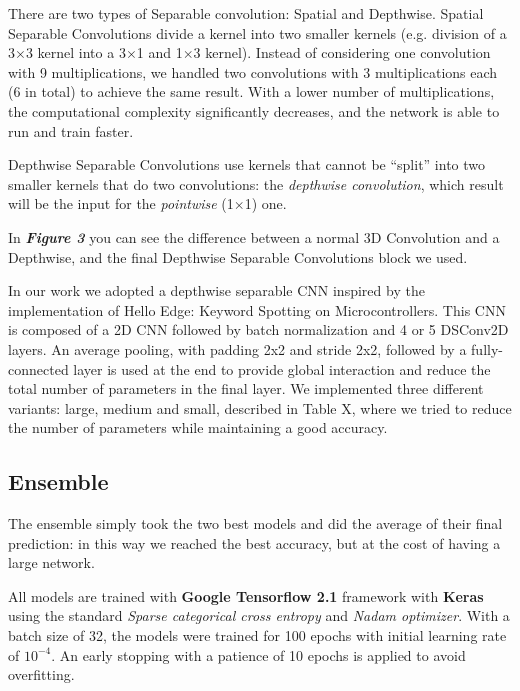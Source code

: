 \documentclass[conference]{IEEEtran}
\begin{document}
There are two types of Separable convolution: Spatial and Depthwise.
Spatial Separable Convolutions divide a kernel into two smaller kernels (e.g. division of a 3$\times$3 kernel into a 3$\times$1 and 1$\times$3 kernel). Instead of considering one convolution with 9 multiplications, we handled two convolutions with 3 multiplications each (6 in total) to achieve the same result. With a lower number of multiplications, the computational complexity significantly decreases, and the network is able to run and train faster.

Depthwise Separable Convolutions use kernels that cannot be “split” into two smaller kernels that do two convolutions: the \textit{depthwise convolution}, which result will be the input for the \textit{pointwise} (1$\times$1) one.

In \textbf{\textit{Figure 3}} you can see the difference between a normal 3D Convolution and a Depthwise, and the final Depthwise Separable Convolutions block we used. 



In our work we adopted a depthwise separable CNN inspired by the implementation of Hello Edge: Keyword Spotting on Microcontrollers.
This CNN is composed of a 2D CNN followed by batch normalization and 4 or 5 DSConv2D layers. An average pooling, with padding 2x2 and stride 2x2, followed by a fully-connected layer is used at the end to provide global interaction and reduce the total number of parameters in the final layer.
We implemented three different variants: large, medium and small, described in Table X, where we tried to reduce the number of parameters while maintaining a good accuracy.

\newpage
\subsection{Ensemble}
The ensemble simply took the two best models and did the average of their final prediction: in this way we reached the best accuracy, but at the cost of having a large network.

All models are trained with \textbf{Google Tensorflow 2.1} framework with \textbf{Keras} using the standard \textit{Sparse categorical cross entropy} and \textit{Nadam optimizer}. With a batch size of 32, the models were trained for 100 epochs with initial learning rate of $10^{-4}$. An early stopping with a patience of 10 epochs is applied to avoid overfitting.
\end{document}
